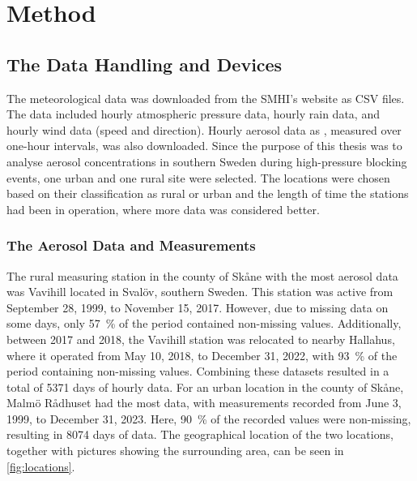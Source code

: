 \newpage
\section{Method} 

\subsection{The Data Handling and Devices}
The meteorological data was downloaded from the SMHI's website as CSV files. The data included hourly atmospheric pressure data, hourly rain data, and hourly wind data (speed and direction). Hourly aerosol data as \PM, measured over one-hour intervals, was also downloaded. Since the purpose of this thesis was to analyse aerosol concentrations in southern Sweden during high-pressure blocking events, one urban and one rural site were selected. The locations were chosen based on their classification as rural or urban and the length of time the stations had been in operation, where more data was considered better.  

\subsubsection{The Aerosol Data and Measurements}
The rural measuring station in the county of Skåne with the most aerosol data was Vavihill located in Svalöv, southern Sweden. This station was active from September 28, 1999, to November 15, 2017. However, due to missing data on some days, only \SI{57}{\%} of the period contained non-missing values. Additionally, between 2017 and 2018, the Vavihill station was relocated to nearby Hallahus, where it operated from May 10, 2018, to December 31, 2022, with \SI{93}{\%} of the period containing non-missing values. Combining these datasets resulted in a total of \SI{5371}{} days of hourly data. For an urban location in the county of Skåne, Malmö Rådhuset had the most data, with measurements recorded from June 3, 1999, to December 31, 2023. Here, \SI{90}{\%} of the recorded values were non-missing, resulting in \SI{8074}{} days of data. The geographical location of the two locations, together with pictures showing the surrounding area, can be seen in \autoref{fig:locations}.

